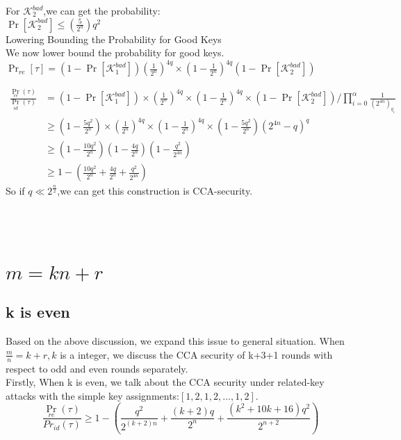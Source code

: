 \documentclass{article}
\begin{document}
For $\mathcal{K}_{2}^{bad}$,we can get the probability:\\
$\Pr[\mathcal{K}_{2}^{bad}]\leq (\frac{5}{2^{n}})q^{2}$\\
Lowering Bounding the Probability for Good Keys\\
We now lower bound the probability for good keys.\\
$\Pr_{re}[\tau]=(1-\Pr[\mathcal{K}_{1}^{bad}])(\frac{1}{2^{n}})^{4q}\times(1-\frac{1}{2^{n}})^{4q}
(1-\Pr[\mathcal{K}_{2}^{bad}])$

\begin{align*}
\frac{\Pr_{re}(\tau)}{\Pr_{id}(\tau)}&= (1-\Pr[\mathcal{K}_{1}^{bad}])\times(\frac{1}{2^{n}})^{4q}\times(1-\frac{1}{2^{n}})^{4q}\times
(1-\Pr[\mathcal{K}_{2}^{bad}]) / \prod_{i=0}^{\alpha}\frac{1}{(2^{4n})_{q_{i}}}\\
&\geq (1-\frac{5q^{2}}{2^{n}})\times(\frac{1}{2^{n}})^{4q}\times(1-\frac{1}{2^{n}})^{4q}\times
(1-\frac{5q^{2}}{2^{n}})(2^{4n}-q)^{q}\\
&\geq(1-\frac{10q^{2}}{2^{n}})(1-\frac{4q}{2^{n}})(1-\frac{q^{2}}{2^{4n}})\\
&\geq 1-( \frac{10q^{2}}{2^{n}}+\frac{4q}{2^{n}} +\frac{q^{2}}{2^{4n}})
\end{align*}
So if $q \ll 2^{\frac{n}{2}}$,we can get this construction is CCA-security.\\
\\
\\
\\

\section{$m=kn+r$}

\subsection{k is even}
Based on the above discussion, we expand this issue to general situation. When $\frac{m}{n}=k+r, k$ is a integer, we discuss the CCA security of k+3+1 rounds with respect to odd and even rounds separately.\\

Firstly, When k is even, we talk about the CCA security under related-key attacks with the simple key assignments:$[1,2,1,2,\dots,1,2]$.\\

\begin{equation}
\frac{\Pr_{re}(\tau)}{Pr_{id}(\tau)}\geq 1-( \frac{q^{2}}{2^{(k+2)n}}+\frac{(k+2)q}{2^{n}} +\frac{(k^{2}+10k+16)q^{2}}{2^{n+2}})
\end{equation}
\end{document}
